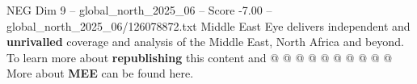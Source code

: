 \begin{textsample}{NEG Dim 9 – global\_north\_2025\_06 – Score -7.00 – global\_north\_2025\_06/126078872.txt}
Middle East Eye delivers independent and \textbf{unrivalled} coverage and analysis of the Middle East, North Africa and beyond.
To learn more about \textbf{republishing} this content and @ @ @ @ @ @ @ @ @ @ More about \textbf{MEE} can be found here.

\end{textsample}
